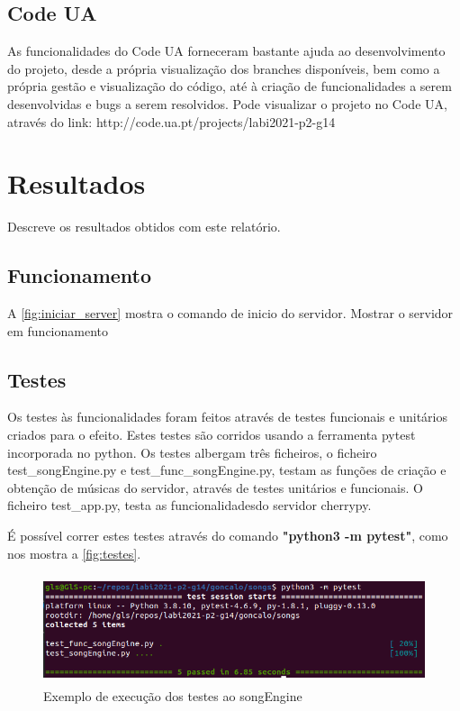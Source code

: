 \documentclass{report}
\begin{document}
\section{Code UA}
\label{sec:codeua}
As funcionalidades do Code UA forneceram bastante ajuda ao desenvolvimento do projeto, 
desde a própria visualização dos branches disponíveis, bem como a própria gestão e 
visualização do código, até à criação de funcionalidades a serem desenvolvidas e bugs 
a serem resolvidos. Pode visualizar o projeto no Code UA, através do 
link: http://code.ua.pt/projects/labi2021-p2-g14
\cite{codeua}


\chapter{Resultados}
\label{chap.resultados}
Descreve os resultados obtidos com este relatório.

\section{Funcionamento}
\label{sec:funcionamento}

A \autoref{fig:iniciar_server} mostra o comando de inicio do servidor.
Mostrar o servidor em funcionamento

\section{Testes}
\label{sec:testes}

Os testes às funcionalidades foram feitos através de testes funcionais e unitários criados para 
o efeito. Estes testes são corridos usando a ferramenta pytest incorporada no python. 
Os testes albergam três ficheiros, o ficheiro test\_songEngine.py e test\_func\_songEngine.py, 
testam as funções de criação e obtenção de músicas do servidor, através de testes unitários e
funcionais. O ficheiro test\_app.py, testa as funcionalidadesdo servidor cherrypy.

É possível correr estes testes através do comando \textbf{"python3 -m pytest"}, como nos mostra 
a \autoref{fig:testes}.

\begin{figure}[ht]
\center 
\includegraphics[height=90pt]{img/pytest.png}
\caption{Exemplo de execução dos testes ao songEngine}
\label{fig:testes}
\end{figure}
\end{document}
